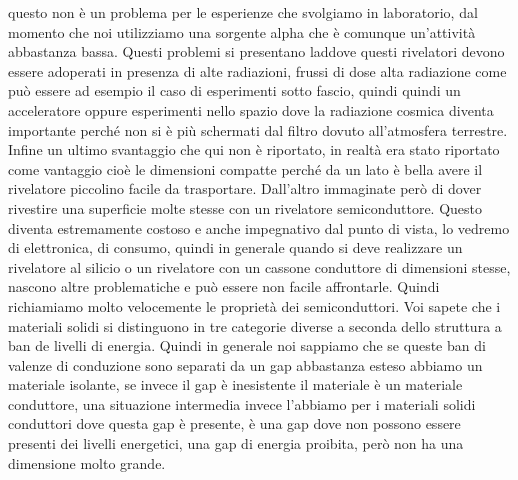 questo non è un problema per le esperienze che svolgiamo in laboratorio, dal momento che noi utilizziamo una sorgente alpha che è comunque un'attività abbastanza bassa. Questi problemi si presentano laddove questi rivelatori devono essere adoperati in presenza di alte radiazioni, frussi di dose alta radiazione come può essere ad esempio il caso di esperimenti sotto fascio, quindi quindi un acceleratore oppure esperimenti nello spazio dove la radiazione cosmica diventa importante perché non si è più schermati dal filtro dovuto all'atmosfera terrestre. Infine un ultimo svantaggio che qui non è riportato, in realtà era stato riportato come vantaggio cioè le dimensioni compatte perché da un lato è bella avere il rivelatore piccolino facile da trasportare. Dall'altro immaginate però di dover rivestire una superficie molte stesse con un rivelatore semiconduttore. Questo diventa estremamente costoso e anche impegnativo dal punto di vista, lo vedremo di elettronica, di consumo, quindi in generale quando si deve realizzare un rivelatore al silicio o un rivelatore con un cassone conduttore di dimensioni stesse, nascono altre problematiche e può essere non facile affrontarle. Quindi richiamiamo molto velocemente le proprietà dei semiconduttori. Voi sapete che i materiali solidi si distinguono in tre categorie diverse a seconda dello struttura a ban de livelli di energia. Quindi in generale noi sappiamo che se queste ban di valenze di conduzione sono separati da un gap abbastanza esteso abbiamo un materiale isolante, se invece il gap è inesistente il materiale è un materiale conduttore, una situazione intermedia invece l'abbiamo per i materiali solidi conduttori dove questa gap è presente, è una gap dove non possono essere presenti dei livelli energetici, una gap di energia proibita, però non ha una dimensione molto grande.

